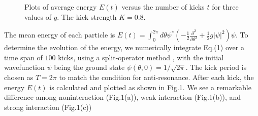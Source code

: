\documentclass[twocolumn,prl,aps,showpacs]{revtex4}
\begin{document}
\begin{figure}[!t]
\begin{center}
\vspace*{-0.5cm}

\end{center}
\vspace*{-1.0cm}
\caption{Plots of average energy $E(t)$ 
versus the number of kicks $%
t $ for three values of $g$. The kick strength $K=0.8$. }
\label{fig:gp}
\end{figure}
The mean energy of each particle is 
$E(t)=\int_0^{2\pi }d\theta \psi ^{*}\left( -\frac 12%
\frac{\partial ^2}{\partial \theta ^2}+\frac 12g\left| \psi \right|
^2\right) \psi$. To determine the evolution of the energy, we
numerically integrate Eq.(1) over a time span of $100$ kicks, using a
split-operator method \cite{split}, with the initial wavefunction $\psi $
being the ground state $\psi \left( \theta ,0\right) =1/\sqrt{2\pi }$. The
kick period is chosen as $T=2\pi $ to match the condition for anti-resonance. After
each kick, the energy $E(t)$ is calculated and plotted as shown
in Fig.1. We see a remarkable difference among noninteraction
(Fig.1(a)), weak interaction (Fig.1(b)), and strong interaction (Fig.1(c)) 
\end{document}
